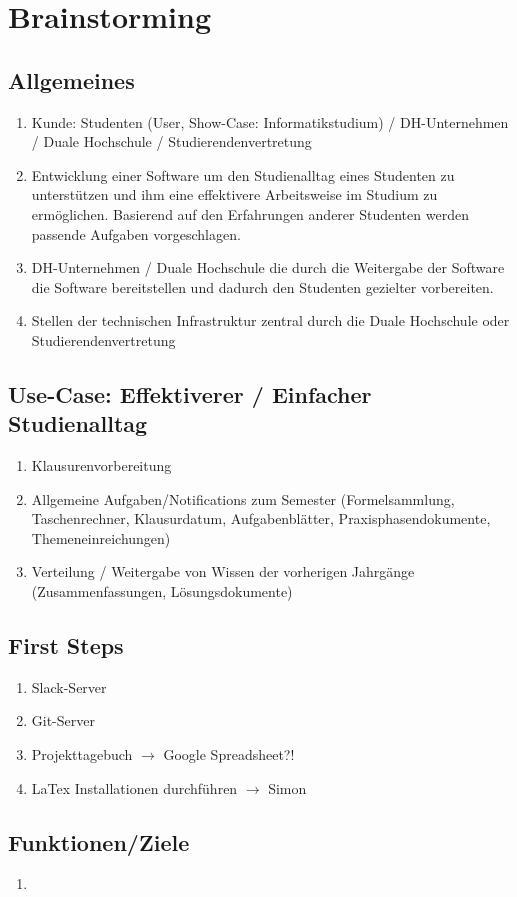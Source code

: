 
\chapter{Brainstorming}

\section{Allgemeines}
\begin{enumerate}
	\item Kunde: Studenten (User, Show-Case: Informatikstudium) / DH-Unternehmen / Duale Hochschule / Studierendenvertretung
	\item Entwicklung einer Software um den Studienalltag eines Studenten zu unterstützen und ihm eine effektivere
	Arbeitsweise im Studium zu ermöglichen. Basierend auf den Erfahrungen anderer Studenten werden passende Aufgaben vorgeschlagen. 
	
	\item DH-Unternehmen / Duale Hochschule die durch die Weitergabe der Software die Software bereitstellen und dadurch
	den Studenten gezielter vorbereiten.
	\item Stellen der technischen Infrastruktur zentral durch die Duale Hochschule oder Studierendenvertretung
\end{enumerate}

\section{Use-Case: Effektiverer / Einfacher Studienalltag}
\begin{enumerate}
	\item Klausurenvorbereitung
	\item Allgemeine Aufgaben/Notifications zum Semester (Formelsammlung, Taschenrechner, Klausurdatum, Aufgabenblätter, Praxisphasendokumente, Themeneinreichungen)
	\item Verteilung / Weitergabe von Wissen der vorherigen Jahrgänge (Zusammenfassungen, Lösungsdokumente)
\end{enumerate}

\section{First Steps}

\begin{enumerate}
	\item Slack-Server
	\item Git-Server
	\item Projekttagebuch $\rightarrow$ Google Spreadsheet?!
	\item LaTex Installationen durchführen $\rightarrow$ Simon
\end{enumerate}

\section{Funktionen/Ziele}

\begin{enumerate}
	\item 
\end{enumerate}